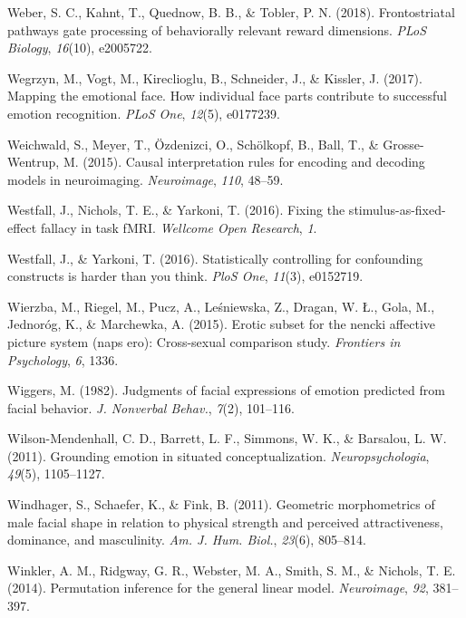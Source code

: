 \documentclass[12pt,american,a4paper,oneside,]{memoir} %
\begin{document}
\leavevmode\hypertarget{ref-weber2018frontostriatal}{}%
Weber, S. C., Kahnt, T., Quednow, B. B., \& Tobler, P. N. (2018). Frontostriatal pathways gate processing of behaviorally relevant reward dimensions. \emph{PLoS Biology}, \emph{16}(10), e2005722.

\leavevmode\hypertarget{ref-Wegrzyn2017-ke}{}%
Wegrzyn, M., Vogt, M., Kireclioglu, B., Schneider, J., \& Kissler, J. (2017). Mapping the emotional face. How individual face parts contribute to successful emotion recognition. \emph{PLoS One}, \emph{12}(5), e0177239.

\leavevmode\hypertarget{ref-Weichwald2015-aj}{}%
Weichwald, S., Meyer, T., Özdenizci, O., Schölkopf, B., Ball, T., \& Grosse-Wentrup, M. (2015). Causal interpretation rules for encoding and decoding models in neuroimaging. \emph{Neuroimage}, \emph{110}, 48--59.

\leavevmode\hypertarget{ref-westfall2016fixing}{}%
Westfall, J., Nichols, T. E., \& Yarkoni, T. (2016). Fixing the stimulus-as-fixed-effect fallacy in task fMRI. \emph{Wellcome Open Research}, \emph{1}.

\leavevmode\hypertarget{ref-westfall2016statistically}{}%
Westfall, J., \& Yarkoni, T. (2016). Statistically controlling for confounding constructs is harder than you think. \emph{PloS One}, \emph{11}(3), e0152719.

\leavevmode\hypertarget{ref-wierzba2015erotic}{}%
Wierzba, M., Riegel, M., Pucz, A., Leśniewska, Z., Dragan, W. Ł., Gola, M., Jednoróg, K., \& Marchewka, A. (2015). Erotic subset for the nencki affective picture system (naps ero): Cross-sexual comparison study. \emph{Frontiers in Psychology}, \emph{6}, 1336.

\leavevmode\hypertarget{ref-Wiggers1982-na}{}%
Wiggers, M. (1982). Judgments of facial expressions of emotion predicted from facial behavior. \emph{J. Nonverbal Behav.}, \emph{7}(2), 101--116.

\leavevmode\hypertarget{ref-wilson2011grounding}{}%
Wilson-Mendenhall, C. D., Barrett, L. F., Simmons, W. K., \& Barsalou, L. W. (2011). Grounding emotion in situated conceptualization. \emph{Neuropsychologia}, \emph{49}(5), 1105--1127.

\leavevmode\hypertarget{ref-Windhager2011-ik}{}%
Windhager, S., Schaefer, K., \& Fink, B. (2011). Geometric morphometrics of male facial shape in relation to physical strength and perceived attractiveness, dominance, and masculinity. \emph{Am. J. Hum. Biol.}, \emph{23}(6), 805--814.

\leavevmode\hypertarget{ref-winkler2014permutation}{}%
Winkler, A. M., Ridgway, G. R., Webster, M. A., Smith, S. M., \& Nichols, T. E. (2014). Permutation inference for the general linear model. \emph{Neuroimage}, \emph{92}, 381--397.
\end{document}

